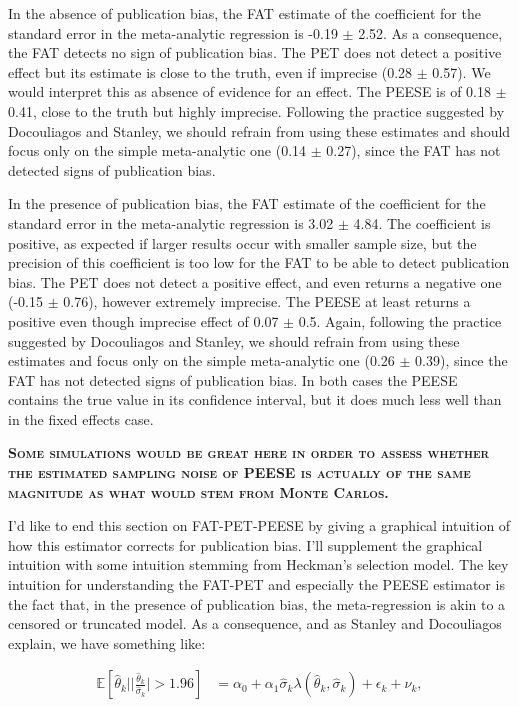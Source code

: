\documentclass[]{book}
\newcommand{\esp}[1]{\mathbb{E}[ #1 ]}
\theoremstyle{definition}
\theoremstyle{definition}
\theoremstyle{definition}
\theoremstyle{remark}
\begin{document}
In the absence of publication bias, the FAT estimate of the coefficient for the standard error in the meta-analytic regression is -0.19 \(\pm\) 2.52.
As a consequence, the FAT detects no sign of publication bias.
The PET does not detect a positive effect but its estimate is close to the truth, even if imprecise (0.28 \(\pm\) 0.57).
We would interpret this as absence of evidence for an effect.
The PEESE is of 0.18 \(\pm\) 0.41, close to the truth but highly imprecise.
Following the practice suggested by Docouliagos and Stanley, we should refrain from using these estimates and should focus only on the simple meta-analytic one (0.14 \(\pm\) 0.27), since the FAT has not detected signs of publication bias.

In the presence of publication bias, the FAT estimate of the coefficient for the standard error in the meta-analytic regression is 3.02 \(\pm\) 4.84.
The coefficient is positive, as expected if larger results occur with smaller sample size, but the precision of this coefficient is too low for the FAT to be able to detect publication bias.
The PET does not detect a positive effect, and even returns a negative one (-0.15 \(\pm\) 0.76), however extremely imprecise.
The PEESE at least returns a positive even though imprecise effect of 0.07 \(\pm\) 0.5.
Again, following the practice suggested by Docouliagos and Stanley, we should refrain from using these estimates and focus only on the simple meta-analytic one (0.26 \(\pm\) 0.39), since the FAT has not detected signs of publication bias.
In both cases the PEESE contains the true value in its confidence interval, but it does much less well than in the fixed effects case.

\textbf{\textsc{Some simulations would be great here in order to assess whether the estimated sampling noise of PEESE is actually of the same magnitude as what would stem from Monte Carlos.}}

I'd like to end this section on FAT-PET-PEESE by giving a graphical intuition of how this estimator corrects for publication bias.
I'll supplement the graphical intuition with some intuition stemming from Heckman's selection model.
The key intuition for understanding the FAT-PET and especially the PEESE estimator is the fact that, in the presence of publication bias, the meta-regression is akin to a censored or truncated model.
As a consequence, and as Stanley and Docouliagos explain, we have something like:

\begin{align*}
\esp{\hat{\theta}_k||\frac{\hat{\theta}_k}{\hat{\sigma}_k}|>1.96} & = \alpha_0 + \alpha_1\hat{\sigma}_k\lambda(\hat{\theta}_k,\hat{\sigma}_k) + \epsilon_k + \nu_k,
\end{align*}
\end{document}
